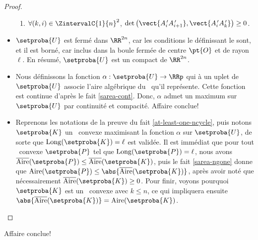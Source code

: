 \begin{proof}
\begin{itemize}
\begin{enumerate}
		    \item
		    $\forall (k, i) \in \ZintervalC{1}{n}^2$,
		    $\det \big( \vect{A^{\,\prime}_i A^{\,\prime}_{i+1}}, \vect{A^{\,\prime}_i A^{\,\prime}_k} \big) \geq 0$.
	    \end{enumerate}


        \item $\setproba{U}$ est fermé dans $\RR^{2n}$, car les conditions le définissant le sont, et il est borné, car inclus dans la boule fermée de centre $\pt{O}$ et de rayon $\ell$.
        En résumé, $\setproba{U}$ est un compact de $\RR^{2n}$.


        \item Nous définissons la fonction $\alpha: \setproba{U} \rightarrow \RRp$ qui à un uplet de $\setproba{U}$ associe l'aire algébrique du \ncycle\ qu'il représente.
        Cette fonction est continue d'après le fait \ref{sarea-cont}.
        Donc, $\alpha$ admet un maximum sur $\setproba{U}$ par continuité et compacité. Affaire conclue!
        
        
        \item Reprenons les notations de la preuve du fait \ref{at-least-one-ncycle}, puis notons $\setproba{K}$ un \ncycle\ convexe maximisant la fonction $\alpha$ sur $\setproba{U}$, de sorte que $\cyclelen{\setproba{K}} = \ell$ est validée.
		Il est immédiat que pour tout \ngone\ convexe $\setproba{P}$ tel que $\cyclelen{\setproba{P}} = \ell$, nous avons $\sarea{\setproba{P}} \leq \sarea{\setproba{K}}$, puis le fait \ref{sarea-ngone} donne que $\area{\setproba{P}} \leq \abs{\sarea{\setproba{K}}}$, après avoir noté que nécessairement $\sarea{\setproba{K}} \geq 0$.
		Pour finir, voyons pourquoi $\setproba{K}$ est un \kgone\ convexe avec $k \leq n$, ce qui impliquera ensuite $\abs{\sarea{\setproba{K}}} = \area{\setproba{K}}$.
    \end{itemize}
	
	\null\vspace{-6ex}
\end{proof}

Affaire conclue!
